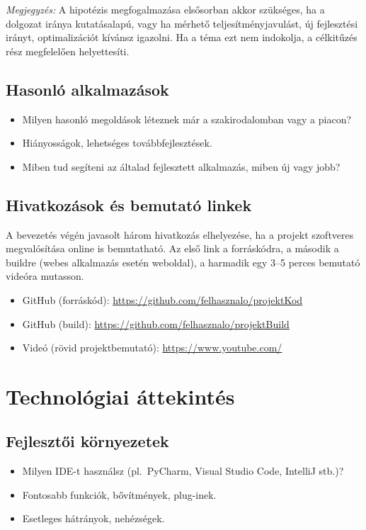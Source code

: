 \documentclass{thesis-ekf}
\begin{document}
\begin{sloppypar}
\textit{Megjegyzés:} A hipotézis megfogalmazása elsősorban akkor szükséges, ha a dolgozat iránya kutatásalapú, vagy ha mérhető teljesítményjavulást, új fejlesztési irányt, optimalizációt kívánsz igazolni. Ha a téma ezt nem indokolja, a célkitűzés rész megfelelően helyettesíti.
\end{sloppypar}

\section{Hasonló alkalmazások}
\begin{itemize}
  \item Milyen hasonló megoldások léteznek már a szakirodalomban vagy a piacon?
  \item Hiányosságok, lehetséges továbbfejlesztések.
  \item Miben tud segíteni az általad fejlesztett alkalmazás, miben új vagy jobb?
\end{itemize}

\section{Hivatkozások és bemutató linkek}
A bevezetés végén javasolt három hivatkozás elhelyezése, ha a projekt szoftveres megvalósítása online is bemutatható. Az első link a forráskódra, a második a buildre (webes alkalmazás esetén weboldal), a harmadik egy 3--5 perces bemutató videóra mutasson.
\begin{itemize}
  \item GitHub (forráskód): \url{https://github.com/felhasznalo/projektKod}
  \item GitHub (build): \url{https://github.com/felhasznalo/projektBuild}
  \item Videó (rövid projektbemutató): \url{https://www.youtube.com/}
\end{itemize}

\chapter{Technológiai áttekintés}

\section{Fejlesztői környezetek}
\begin{itemize}
  \item Milyen IDE-t használsz (pl.\ PyCharm, Visual Studio Code, IntelliJ stb.)?
  \item Fontosabb funkciók, bővítmények, plug-inek.
  \item Esetleges hátrányok, nehézségek.
\end{itemize}
\end{document}
